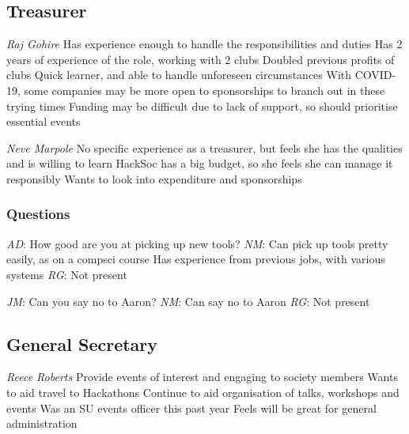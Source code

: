 \documentclass[11pt]{meetingmins}
\begin{document}
\subsection{Treasurer}
\begin{items}
	\item
	\textit{Raj Gohire}
		\subitem
		Has experience enough to handle the responsibilities and duties
		\subitem
		Has 2 years of experience of the role, working with 2 clubs
		\subitem
		Doubled previous profits of clubs
		\subitem
		Quick learner, and able to handle unforeseen circumstances
		\subitem
		With COVID-19, some companies may be more open to sponsorships to branch out in these trying times
		\subitem
		Funding may be difficult due to lack of support, so should prioritise essential events

	\item
	\textit{Neve Marpole}
		\subitem
		No specific experience as a treasurer, but feels she has the qualities and is willing to learn
		\subitem
		HackSoc has a big budget, so she feels she can manage it responsibly
		\subitem
		Wants to look into expenditure and sponsorships

\end{items}

\subsubsection{Questions}	
\begin{items}
	\item
	\textit{AD}: How good are you at picking up new tools?
		\subitem
		\textit{NM}:
			\subsubitem
			Can pick up tools pretty easily, as on a compsci course
			\subsubitem
			Has experience from previous jobs, with various systems
		\subitem
		\textit{RG}:
			\subsubitem
			Not present
	\item
	\textit{JM}: Can you say no to Aaron?
		\subitem
		\textit{NM}: Can say no to Aaron
		\subitem
		\textit{RG}: Not present
\end{items}

\subsection{General Secretary}
\begin{items}
	\item
	\textit{Reece Roberts}
		\subitem
		Provide events of interest and engaging to society members
		\subitem
		Wants to aid travel to Hackathons
		\subitem
		Continue to aid organisation of talks, workshops and events
		\subitem
		Was an SU events officer this past year
		\subitem
		Feels will be great for general administration
\end{items}
\end{document}
